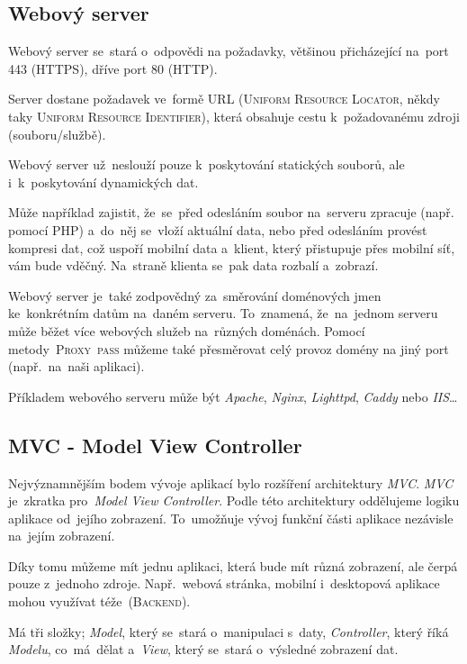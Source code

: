 \documentclass[14pt,a4paper]{article}
\begin{document}
        \subsection{Webový server}
        Webový server se~stará o~odpovědi na požadavky, většinou přicházející na~port 443 (\textsc{HTTPS}), dříve port 80 (\textsc{HTTP}).

        Server dostane požadavek ve~formě URL (\textsc{Uniform Resource Locator}, někdy taky \textsc{Uniform Resource Identifier}), která obsahuje cestu k~požadovanému zdroji (souboru/službě).

        Webový server už~neslouží pouze k~poskytování statických souborů, ale i~k~poskytování dynamických dat.

        Může například zajistit, že~se~před odesláním soubor na~serveru zpracuje (např. pomocí PHP) a~do~něj se~vloží aktuální data, nebo před odesláním provést kompresi dat, což uspoří mobilní data a~klient, který přistupuje přes mobilní síť, vám bude vděčný. Na~straně klienta se~pak data rozbalí a~zobrazí.

        Webový server je~také zodpovědný za~směrování doménových jmen ke~konkrétním datům na~daném serveru. To~znamená, že~na~jednom serveru může běžet více webových služeb na~různých doménách.
        Pomocí metody~\textsc{Proxy~pass} můžeme také přesměrovat celý provoz domény na jiný port (např.~na~naši aplikaci). \cite{webserver:mdn}

        Příkladem webového serveru může být \emph{Apache}, \emph{Nginx}, \emph{Lighttpd}, \emph{Caddy} nebo \emph{IIS}\dots

        
        \subsection{MVC - Model View Controller}
        Nejvýznamnějším bodem vývoje aplikací bylo rozšíření architektury \emph{MVC}. \emph{MVC} je~zkratka pro~\emph{Model View Controller}. Podle této architektury oddělujeme logiku aplikace od~jejího zobrazení. To~umožňuje vývoj funkční části aplikace nezávisle na~jejím zobrazení.

        Díky tomu můžeme mít jednu aplikaci, která bude mít různá zobrazení, ale čerpá pouze z~jednoho zdroje. Např.~webová stránka, mobilní i~desktopová aplikace mohou využívat téže~(\textsc{Backend}).

        Má tři složky; \emph{Model}, který se~stará o~manipulaci s~daty, \emph{Controller}, který říká \emph{Modelu}, co~má~dělat a~\emph{View}, který se~stará o~výsledné zobrazení dat. \cite{MVC}
\end{document}
